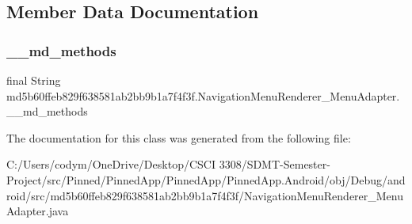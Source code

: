 \subsection{Member Data Documentation}
\mbox{\label{classmd5b60ffeb829f638581ab2bb9b1a7f4f3f_1_1_navigation_menu_renderer___menu_adapter_a09a523e0422c5d80d38ab17bbf6fe89b}} 
\subsubsection{\texorpdfstring{\+\_\+\+\_\+md\+\_\+methods}{\_\_md\_methods}}
{\footnotesize\ttfamily final String md5b60ffeb829f638581ab2bb9b1a7f4f3f.\+Navigation\+Menu\+Renderer\+\_\+\+Menu\+Adapter.\+\_\+\+\_\+md\+\_\+methods\hspace{0.3cm}{\ttfamily [static]}}



The documentation for this class was generated from the following file\+:\begin{DoxyCompactItemize}
\item 
C\+:/\+Users/codym/\+One\+Drive/\+Desktop/\+C\+S\+C\+I 3308/\+S\+D\+M\+T-\/\+Semester-\/\+Project/src/\+Pinned/\+Pinned\+App/\+Pinned\+App/\+Pinned\+App.\+Android/obj/\+Debug/android/src/md5b60ffeb829f638581ab2bb9b1a7f4f3f/Navigation\+Menu\+Renderer\+\_\+\+Menu\+Adapter.\+java\end{DoxyCompactItemize}
